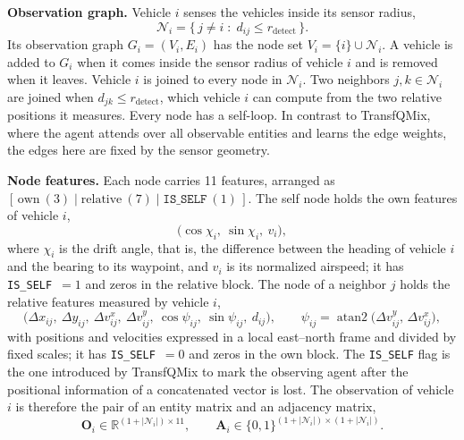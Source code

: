 \textbf{Observation graph.} Vehicle $i$ senses the vehicles inside its sensor radius,
\begin{equation}
\label{eq:neighbors}
\mathcal{N}_i = \{\, j \neq i \;:\; d_{ij} \le r_{\text{detect}} \,\}.
\end{equation}
Its observation graph $G_i=(V_i,E_i)$ has the node set $V_i=\{i\}\cup\mathcal{N}_i$. A vehicle
is added to $G_i$ when it comes inside the sensor radius of vehicle $i$ and is removed when
it leaves. Vehicle $i$ is joined to every node in $\mathcal{N}_i$. Two neighbors
$j,k\in\mathcal{N}_i$ are joined when $d_{jk}\le r_{\text{detect}}$, which vehicle $i$ can
compute from the two relative positions it measures. Every node has a self-loop. In contrast
to TransfQMix, where the agent attends over all observable entities and learns the edge
weights, the edges here are fixed by the sensor geometry.

\textbf{Node features.} Each node carries 11 features, arranged as
$[\,\text{own}\ (3)\;|\;\text{relative}\ (7)\;|\;\texttt{IS\_SELF}\ (1)\,]$. The self node
holds the own features of vehicle $i$,
\begin{equation}
\label{eq:own}
\big(\cos\chi_i,\ \sin\chi_i,\ v_i\big),
\end{equation}
where $\chi_i$ is the drift angle, that is, the difference between the heading of vehicle
$i$ and the bearing to its waypoint, and $v_i$ is its normalized airspeed; it has
\texttt{IS\_SELF}~$=1$ and zeros in the relative block. The node of a neighbor $j$ holds the
relative features measured by vehicle $i$,
\begin{equation}
\label{eq:rel}
\big(\Delta x_{ij},\ \Delta y_{ij},\ \Delta v^{x}_{ij},\ \Delta v^{y}_{ij},\
\cos\psi_{ij},\ \sin\psi_{ij},\ d_{ij}\big),
\qquad \psi_{ij} = \operatorname{atan2}\!\big(\Delta v^{y}_{ij},\,\Delta v^{x}_{ij}\big),
\end{equation}
with positions and velocities expressed in a local east--north frame and divided by fixed
scales; it has \texttt{IS\_SELF}~$=0$ and zeros in the own block. The \texttt{IS\_SELF} flag
is the one introduced by TransfQMix to mark the observing agent after the positional
information of a concatenated vector is lost. The observation of vehicle $i$ is therefore
the pair of an entity matrix and an adjacency matrix,
\begin{equation}
\label{eq:obs-matrix}
\mathbf{O}_i \in \mathbb{R}^{(1+|\mathcal{N}_i|)\times 11},
\qquad
\mathbf{A}_i \in \{0,1\}^{(1+|\mathcal{N}_i|)\times(1+|\mathcal{N}_i|)} .
\end{equation}

